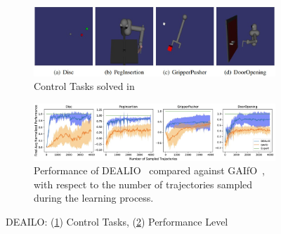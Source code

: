 \begin{figure}[th]
    \centering
    \begin{subfigure}[b]{0.8\textwidth}
        \centering
        \includegraphics[width=\textwidth]{Figures/images/dealio/dealio_performed_task.jpg}
        \caption{Control Tasks solved in~\cite{torabi2021dealio}}
        \label{fig:dealio_task}
    \end{subfigure}
    \vfill
    \begin{subfigure}[b]{0.8\textwidth}
        \includegraphics[width=\textwidth]{Figures/images/dealio/dealio_performance.jpg}
        \caption{Performance of DEALIO~\cite{torabi2021dealio} compared against GAIfO~\cite{torabi2018gaifo}, with respect to the number of trajectories sampled during the learning process.}
        \label{fig:dealio_performance}
    \end{subfigure}
    \caption{DEAILO: (\ref{fig:dealio_task}) Control Tasks, (\ref{fig:dealio_performance}) Performance Level}
    \label{fig:dealio}
\end{figure}
